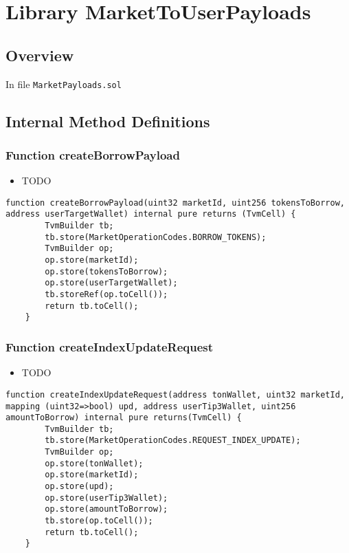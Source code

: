 
\chapter{Library MarketToUserPayloads}

\minitoc

\section{Overview}


In file {\tt MarketPayloads.sol}

\section{Internal Method Definitions}


\subsection{Function createBorrowPayload}

\noindent\begin{itemize}
\item TODO
\end{itemize}

\begin{lstlisting}[firstnumber=26]
    function createBorrowPayload(uint32 marketId, uint256 tokensToBorrow, address userTargetWallet) internal pure returns (TvmCell) {
        TvmBuilder tb;
        tb.store(MarketOperationCodes.BORROW_TOKENS);
        TvmBuilder op;
        op.store(marketId);
        op.store(tokensToBorrow);
        op.store(userTargetWallet);
        tb.storeRef(op.toCell());
        return tb.toCell();
    }
\end{lstlisting}

\subsection{Function createIndexUpdateRequest}

\noindent\begin{itemize}
\item TODO
\end{itemize}

\begin{lstlisting}[firstnumber=88]
    function createIndexUpdateRequest(address tonWallet, uint32 marketId, mapping (uint32=>bool) upd, address userTip3Wallet, uint256 amountToBorrow) internal pure returns(TvmCell) {
        TvmBuilder tb;
        tb.store(MarketOperationCodes.REQUEST_INDEX_UPDATE);
        TvmBuilder op;
        op.store(tonWallet);
        op.store(marketId);
        op.store(upd);
        op.store(userTip3Wallet);
        op.store(amountToBorrow);
        tb.store(op.toCell());
        return tb.toCell();
    }
\end{lstlisting}

